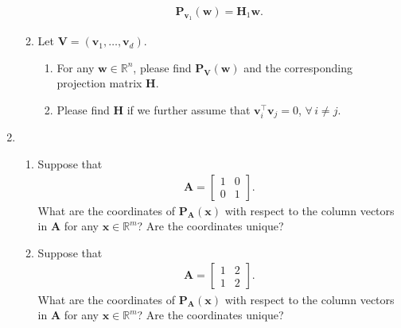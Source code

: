 \documentclass[11pt,letter,notitlepage]{article}
\newcommand{\proj}[2]{\textbf{P}_{#2} (#1)}
\begin{document}
\begin{exercise}
\begin{enumerate}
\begin{enumerate}
                        \begin{align*}
                            \proj{\mathbf{w}}{\mathbf{v}_1}=\mathbf{H}_1\mathbf{w}.
                        \end{align*}
                  \item Let $\mathbf{V}=(\mathbf{v}_1,\ldots,\mathbf{v}_d)$.
                        \begin{enumerate}
                            \item For any $\mathbf{w}\in \mathbb{R}^n$, please find $\proj{\mathbf{w}}{\mathbf{V}}$ and the corresponding projection matrix $\mathbf{H}$.
                            \item Please find $\mathbf{H}$ if we further assume that $\mathbf{v}_i^{\top}\mathbf{v}_j=0$, $\forall\,i\neq j$.
                        \end{enumerate}
              \end{enumerate}

        \item
              \begin{enumerate}
                  \item Suppose that
                        \begin{align*}
                            \mathbf{A} = \left[
                                \begin{matrix}
                                    1 & 0 \\
                                    0 & 1
                                \end{matrix}
                                \right] .
                        \end{align*}
                        What are the coordinates of $\mathbf{P}_{\mathbf{A}}(\mathbf{x})$ with respect to the column vectors in $\mathbf{A}$ for any $\mathbf{x} \in \mathbb{R}^m$? Are the coordinates unique?
                  \item Suppose that
                        \begin{align*}
                            \mathbf{A} = \left[
                                \begin{matrix}
                                    1 & 2 \\
                                    1 & 2
                                \end{matrix}
                                \right] .
                        \end{align*}
                        What are the coordinates of $\mathbf{P}_{\mathbf{A}}(\mathbf{x})$ with respect to the column vectors in $\mathbf{A}$ for any $\mathbf{x} \in \mathbb{R}^m$? Are the coordinates unique?
              \end{enumerate}


\end{enumerate}
\end{exercise}
\end{document}
